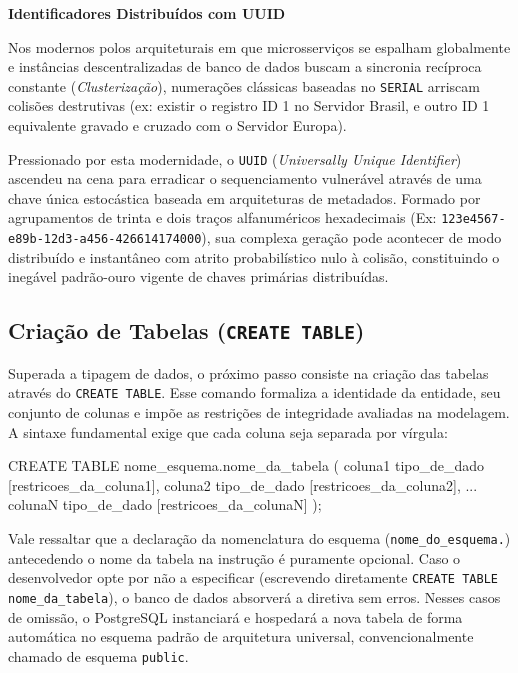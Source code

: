 \vspace{0.3cm}
\noindent\textbf{Identificadores Distribuídos com UUID}

Nos modernos polos arquiteturais em que microsserviços se espalham globalmente e instâncias descentralizadas de banco de dados buscam a sincronia recíproca constante (\textit{Clusterização}), numerações clássicas baseadas no \texttt{SERIAL} arriscam colisões destrutivas (ex: existir o registro ID 1 no Servidor Brasil, e outro ID 1 equivalente gravado e cruzado com o Servidor Europa).

Pressionado por esta modernidade, o \texttt{UUID} (\textit{Universally Unique Identifier}) ascendeu na cena para erradicar o sequenciamento vulnerável através de uma chave única estocástica baseada em arquiteturas de metadados. Formado por agrupamentos de trinta e dois traços alfanuméricos hexadecimais (Ex: \texttt{123e4567-e89b-12d3-a456-426614174000}), sua complexa geração pode acontecer de modo distribuído e instantâneo com atrito probabilístico nulo à colisão, constituindo o inegável padrão-ouro vigente de chaves primárias distribuídas.

\subsection{Criação de Tabelas (\texttt{CREATE TABLE})}

Superada a tipagem de dados, o próximo passo consiste na criação das tabelas através do \texttt{CREATE TABLE}. Esse comando formaliza a identidade da entidade, seu conjunto de colunas e impõe as restrições de integridade avaliadas na modelagem. A sintaxe fundamental exige que cada coluna seja separada por vírgula:

\begin{sqlcode}
CREATE TABLE nome_esquema.nome_da_tabela (
    coluna1 tipo_de_dado [restricoes_da_coluna1],
    coluna2 tipo_de_dado [restricoes_da_coluna2],
    ...
    colunaN tipo_de_dado [restricoes_da_colunaN]
);
\end{sqlcode}

\vspace{0.3cm}
Vale ressaltar que a declaração da nomenclatura do esquema (\texttt{nome\_do\_esquema.}) antecedendo o nome da tabela na instrução é puramente opcional. Caso o desenvolvedor opte por não a especificar (escrevendo diretamente \texttt{CREATE TABLE nome\_da\_tabela}), o banco de dados absorverá a diretiva sem erros. Nesses casos de omissão, o PostgreSQL instanciará e hospedará a nova tabela de forma automática no esquema padrão de arquitetura universal, convencionalmente chamado de esquema \texttt{public}.

